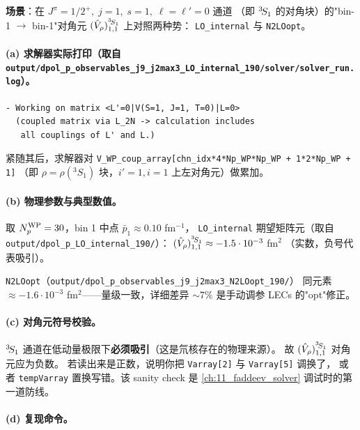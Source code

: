 \begin{numericalbox}[label={box:ch08-numerical-closure}]
\textbf{场景}：在 \(J^\pi = 1/2^+, \;j = 1, \;s = 1, \;\ell = \ell' = 0\) 通道
（即 \({}^{3}\!S_{1}\) 的对角块）的"bin-1 \(\to\) bin-1"对角元
\((\hat{V}_\rho)_{1, 1}^{{}^{3}\!S_{1}}\) 上对照两种势：
\texttt{LO\_internal} 与 \texttt{N2LOopt}。

\paragraph{(a) 求解器实际打印（取自 \texttt{output/dpol\_p\_observables\_j9\_j2max3\_LO\_internal\_190/solver/solver\_run.log}）。}

\begin{verbatim}
- Working on matrix <L'=0|V(S=1, J=1, T=0)|L=0>
  (coupled matrix via L_2N -> calculation includes
   all couplings of L' and L.)
\end{verbatim}

紧随其后，求解器对 \texttt{V\_WP\_coup\_array[chn\_idx*4*Np\_WP*Np\_WP + 1*2*Np\_WP + 1]}
（即 \(\rho = \rho({}^3S_1)\) 块，\(i' = 1, i = 1\) 上左对角元）做累加。

\paragraph{(b) 物理参数与典型数值。}

取 \({N_{p}^{\text{WP}}} = 30\)，bin 1 中点 \(\bar{p}_1 \approx 0.10\) fm\(^{-1}\)，
\texttt{LO\_internal} 期望矩阵元（取自 \texttt{output/dpol\_p\_LO\_internal\_190/}）：
\((\hat{V}_\rho)_{1, 1}^{{}^{3}\!S_{1}} \approx -1.5 \cdot 10^{-3}\) fm\(^{2}\)
（实数，负号代表吸引）。

\texttt{N2LOopt}（\texttt{output/dpol\_p\_observables\_j9\_j2max3\_N2LOopt\_190/}）
同元素 \(\approx -1.6 \cdot 10^{-3}\) fm\(^{2}\)——量级一致，详细差异
\(\sim 7\%\) 是手动调参 LECs 的"opt"修正。

\paragraph{(c) 对角元符号校验。}
\({}^{3}\!S_{1}\) 通道在低动量极限下\textbf{必须吸引}（这是氘核存在的物理来源）。
故 \((\hat{V}_\rho)_{1, 1}^{{}^{3}\!S_{1}}\) 对角元应为负数。
若读出来是正数，说明你把 \texttt{Varray[2]} 与 \texttt{Varray[5]} 调换了，
或者 \texttt{tempVarray} 置换写错。该 sanity check 是
\cref{ch:11_faddeev_solver} 调试时的第一道防线。

\paragraph{(d) 复现命令。}


\end{numericalbox}
